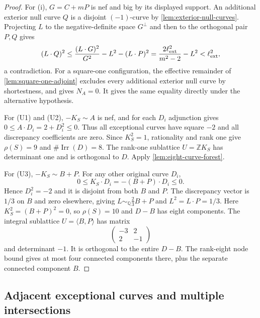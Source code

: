 \documentclass[11pt,reqno]{amsart}
\theoremstyle{definition}
\theoremstyle{remark}
\DeclareMathOperator{\Irr}{Irr}
\newcommand{\QQ}{\mathbb Q}
\newcommand{\ZZ}{\mathbb Z}
\numberwithin{equation}{section}
\begin{document}
\begin{proof}
For \textup{(i)}, $G=C+mP$ is nef and big by its displayed support.
An additional exterior null curve $Q$ is a disjoint $(-1)$-curve by
\cref{lem:exterior-null-curves}. Projecting $L$ to the negative-definite
space $G^\perp$ and then to the orthogonal pair $P,Q$ gives
\[
 (L\cdot Q)^2\le
 \frac{(L\cdot G)^2}{G^2}-L^2-(L\cdot P)^2
 =\frac{2\ell_{\rm ext}^2}{m^2-2}-L^2<\ell_{\rm ext}^2,
\]
a contradiction. 
For a square-one configuration, the effective remainder of
\cref{lem:square-one-adjoint} excludes every additional exterior
null curve by shortestness, and gives $N_A=0$.
It gives the same equality directly under the alternative hypothesis.

For \textup{(U1)} and \textup{(U2)}, $-K_S\sim A$ is nef, and for
each $D_i$ adjunction gives $0\le A\cdot D_i=2+D_i^2\le0$.
Thus all exceptional curves have square $-2$ and all discrepancy coefficients
are zero. Since $K_S^2=1$, rationality and rank one give $\rho(S)=9$
and $\#\Irr(D)=8$. The rank-one sublattice $U=\ZZ K_S$ has determinant
one and is orthogonal to $D$. Apply \cref{lem:eight-curve-forest}.

For \textup{(U3)}, $-K_S\sim B+P$.
For any other original curve $D_i$,
\[
 0\le K_S\cdot D_i=-(B+P)\cdot D_i\le0.
\]
Hence $D_i^2=-2$ and it is disjoint from both $B$ and $P$.
The discrepancy vector is $1/3$ on $B$ and zero elsewhere, giving
$L\sim_{\QQ}\frac23B+P$ and $L^2=L\cdot P=1/3$.
Here $K_S^2=(B+P)^2=0$, so $\rho(S)=10$ and $D-B$ has eight
components. The integral sublattice $U=\langle B,P\rangle$ has matrix
\[
 \begin{pmatrix}-3&2\\2&-1\end{pmatrix}
\]
and determinant $-1$. It is orthogonal to the entire $D-B$.
The rank-eight node bound gives at most four connected components there, plus the
separate connected component $B$.
\end{proof}

\subsection{Adjacent exceptional curves and multiple intersections}
\end{document}
